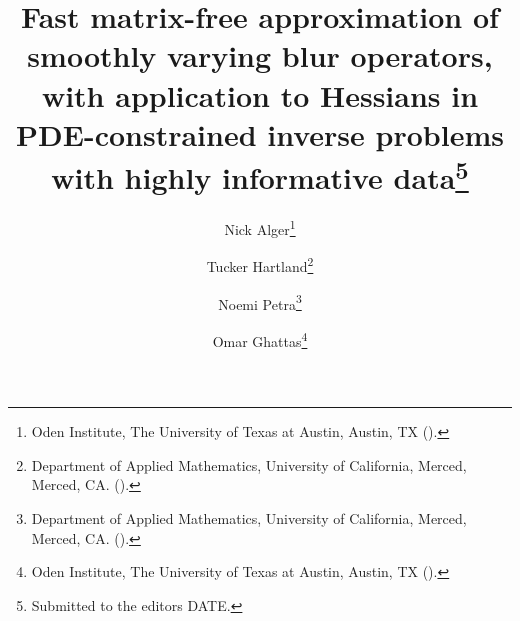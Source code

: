 

\usepackage{lipsum}
\usepackage{amsfonts}
\usepackage{graphicx}
\usepackage{epstopdf}
\usepackage{amsmath}
\usepackage[algo2e, ruled, noend, linesnumbered]{algorithm2e}
\usepackage{bm}
\ifpdf
\else
\fi

\newcommand{\creflastconjunction}{, and~}
\newcommand{\nor}[1]{\left\|#1\right\|}



\newcommand{\norm}[1]{\|#1\|}



\title{Fast matrix-free approximation of smoothly varying blur operators, with application to Hessians in PDE-constrained inverse problems with highly informative data\thanks{Submitted to the editors DATE.
}}

\author{Nick Alger\thanks{Oden Institute, The University of Texas at Austin, Austin, TX 
  ().}
\and Tucker Hartland\thanks{Department of Applied Mathematics, University of California, Merced, Merced, CA. 
	().}
\and Noemi Petra\thanks{Department of Applied Mathematics, University of California, Merced, Merced, CA. 
  ().}
\and Omar Ghattas\thanks{Oden Institute, The University of Texas at Austin, Austin, TX 
	().}}

